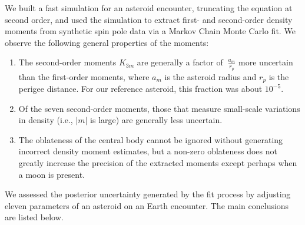 \documentclass[fleqn,usenatbib]{mnras}
\begin{document}
We built a fast simulation for an asteroid encounter, truncating the equation at second order, and used the simulation to extract first- and second-order density moments from synthetic spin pole data via a Markov Chain Monte Carlo fit. We observe the following general properties of the moments:
\begin{enumerate}
  \item The second-order moments $K_{3m}$ are generally a factor of $~\frac{a_m}{r_p}$ more uncertain than the first-order moments, where $a_m$ is the asteroid radius and $r_p$ is the perigee distance. For our reference asteroid, this fraction was about $10^{-5}$.
  \item Of the seven second-order moments, those that measure small-scale variations in density (i.e., $|m|$ is large) are generally less uncertain.
  \item The oblateness of the central body cannot be ignored without generating incorrect density moment estimates, but a non-zero oblateness does not greatly increase the precision of the extracted moments except perhaps when a moon is present.
\end{enumerate}

We assessed the posterior uncertainty generated by the fit process by adjusting eleven parameters of an asteroid on an Earth encounter. The main conclusions are listed below.
\end{document}

